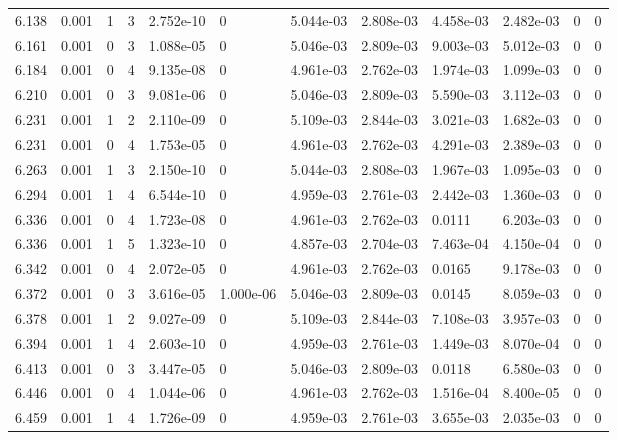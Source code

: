 \documentclass[preview]{standalone}
\begin{document}
{{{{{{{{\begin{tabular}{L{1.2cm}C{1.2cm} C{0.3cm}C{0.5cm} C{1.4cm}C{1.4cm} C{1.4cm}C{1.4cm} C{1.6cm}C{1.6cm} C{1.6cm}C{1.6cm}}
  6.138  &  0.001  & 1     &  3 &  2.752e-10  & 0  &  5.044e-03&   2.808e-03& 4.458e-03 & 2.482e-03   &  0 & 0  \\ 
  6.161  &  0.001  & 0     &  3 &  1.088e-05  & 0  &  5.046e-03&   2.809e-03& 9.003e-03 & 5.012e-03   &  0 & 0  \\ 
  6.184  &  0.001  & 0     &  4 &  9.135e-08  & 0  &  4.961e-03&   2.762e-03& 1.974e-03 & 1.099e-03   &  0 & 0  \\ 
  6.210  &  0.001  & 0     &  3 &  9.081e-06  & 0  &  5.046e-03&   2.809e-03& 5.590e-03 & 3.112e-03   &  0 & 0  \\ 
  6.231  &  0.001  & 1     &  2 &  2.110e-09  & 0  &  5.109e-03&   2.844e-03& 3.021e-03 & 1.682e-03   &  0 & 0  \\ 
  6.231  &  0.001  & 0     &  4 &  1.753e-05  & 0  &  4.961e-03&   2.762e-03& 4.291e-03 & 2.389e-03   &  0 & 0  \\ 
  6.263  &  0.001  & 1     &  3 &  2.150e-10  & 0  &  5.044e-03&   2.808e-03& 1.967e-03 & 1.095e-03   &  0 & 0  \\ 
  6.294  &  0.001  & 1     &  4 &  6.544e-10  & 0  &  4.959e-03&   2.761e-03& 2.442e-03 & 1.360e-03   &  0 & 0  \\ 
  6.336  &  0.001  & 0     &  4 &  1.723e-08  & 0  &  4.961e-03&   2.762e-03& 0.0111 & 6.203e-03   &  0 & 0  \\ 
  6.336  &  0.001  & 1     &  5 &  1.323e-10  & 0  &  4.857e-03&   2.704e-03& 7.463e-04 & 4.150e-04   &  0 & 0  \\ 
  6.342  &  0.001  & 0     &  4 &  2.072e-05  & 0  &  4.961e-03&   2.762e-03& 0.0165 & 9.178e-03   &  0 & 0  \\ 
  6.372  &  0.001  & 0     &  3 &  3.616e-05  & 1.000e-06  &  5.046e-03&   2.809e-03& 0.0145 & 8.059e-03   &  0 & 0  \\ 
  6.378  &  0.001  & 1     &  2 &  9.027e-09  & 0  &  5.109e-03&   2.844e-03& 7.108e-03 & 3.957e-03   &  0 & 0  \\ 
  6.394  &  0.001  & 1     &  4 &  2.603e-10  & 0  &  4.959e-03&   2.761e-03& 1.449e-03 & 8.070e-04   &  0 & 0  \\ 
  6.413  &  0.001  & 0     &  3 &  3.447e-05  & 0  &  5.046e-03&   2.809e-03& 0.0118 & 6.580e-03   &  0 & 0  \\ 
  6.446  &  0.001  & 0     &  4 &  1.044e-06  & 0  &  4.961e-03&   2.762e-03& 1.516e-04 & 8.400e-05   &  0 & 0  \\ 
  6.459  &  0.001  & 1     &  4 &  1.726e-09  & 0  &  4.959e-03&   2.761e-03& 3.655e-03 & 2.035e-03   &  0 & 0  \\ 

\end{tabular}}}}}}}}}
\end{document}
